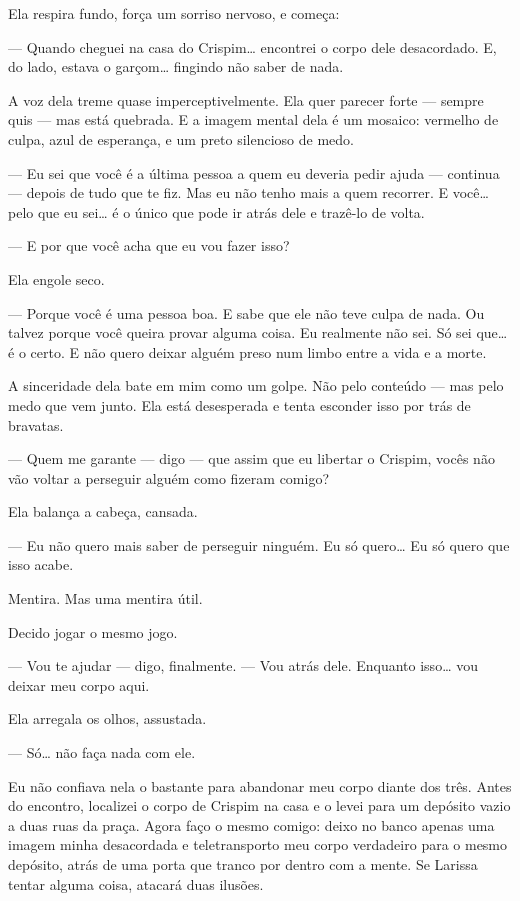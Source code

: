 Ela respira fundo, força um sorriso nervoso, e começa:

— Quando cheguei na casa do Crispim… encontrei o corpo dele desacordado. E, do lado, estava o garçom… fingindo não saber de nada.

A voz dela treme quase imperceptivelmente.  
Ela quer parecer forte — sempre quis — mas está quebrada.  
E a imagem mental dela é um mosaico:  
vermelho de culpa, azul de esperança, e um preto silencioso de medo.

— Eu sei que você é a última pessoa a quem eu deveria pedir ajuda — continua — depois de tudo que te fiz. Mas eu não tenho mais a quem recorrer. E você… pelo que eu sei… é o único que pode ir atrás dele e trazê-lo de volta.

— E por que você acha que eu vou fazer isso?

Ela engole seco.

— Porque você é uma pessoa boa.  
E sabe que ele não teve culpa de nada.  
Ou talvez porque você queira provar alguma coisa.  
Eu realmente não sei.  
Só sei que… é o certo.  
E não quero deixar alguém preso num limbo entre a vida e a morte.

A sinceridade dela bate em mim como um golpe.  
Não pelo conteúdo — mas pelo medo que vem junto.  
Ela está desesperada e tenta esconder isso por trás de bravatas.

— Quem me garante — digo — que assim que eu libertar o Crispim, vocês não vão voltar a perseguir alguém como fizeram comigo?

Ela balança a cabeça, cansada.

— Eu não quero mais saber de perseguir ninguém.  
Eu só quero…  
Eu só quero que isso acabe.

Mentira.  
Mas uma mentira útil.

Decido jogar o mesmo jogo.

— Vou te ajudar — digo, finalmente. — Vou atrás dele.  
Enquanto isso… vou deixar meu corpo aqui.

Ela arregala os olhos, assustada.

— Só… não faça nada com ele.

Eu não confiava nela o bastante para abandonar meu corpo diante dos três. Antes do encontro, localizei o corpo de Crispim na casa e o levei para um depósito vazio a duas ruas da praça. Agora faço o mesmo comigo: deixo no banco apenas uma imagem minha desacordada e teletransporto meu corpo verdadeiro para o mesmo depósito, atrás de uma porta que tranco por dentro com a mente. Se Larissa tentar alguma coisa, atacará duas ilusões.

